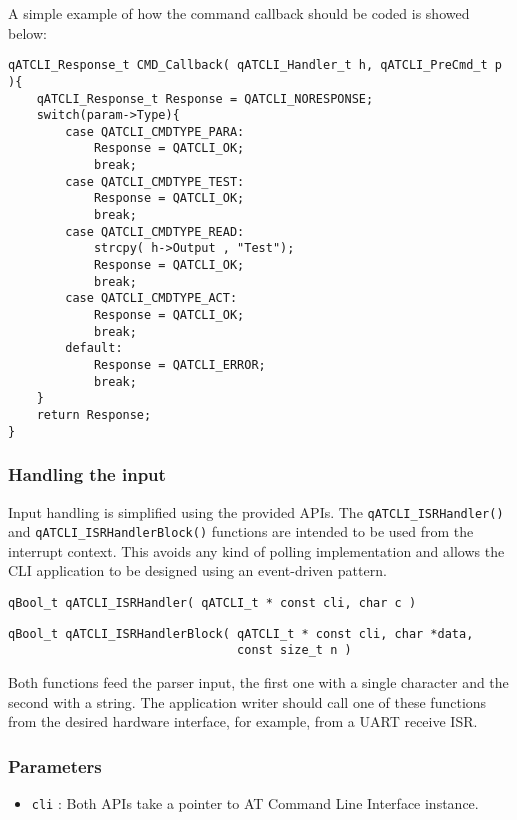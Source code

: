 A simple example of how the command callback should be coded is showed below: \\

\begin{lstlisting}[style=CStyle]
qATCLI_Response_t CMD_Callback( qATCLI_Handler_t h, qATCLI_PreCmd_t p ){
	qATCLI_Response_t Response = QATCLI_NORESPONSE;
	switch(param->Type){
		case QATCLI_CMDTYPE_PARA:
			Response = QATCLI_OK;
			break;
		case QATCLI_CMDTYPE_TEST:
			Response = QATCLI_OK;
			break;
		case QATCLI_CMDTYPE_READ:
		    strcpy( h->Output , "Test");
			Response = QATCLI_OK;
			break;
		case QATCLI_CMDTYPE_ACT:
			Response = QATCLI_OK;
			break;			
		default:
			Response = QATCLI_ERROR;
			break;
	}
	return Response;
}
\end{lstlisting}


\subsubsection{Handling the input}
Input handling is simplified using the provided APIs. The \lstinline{qATCLI_ISRHandler()}  and \lstinline{qATCLI_ISRHandlerBlock()}   functions are intended to be used from the interrupt context. This avoids any kind of polling implementation and allows the CLI application to be designed using an event-driven pattern.

\begin{lstlisting}[style=CStyle]
qBool_t qATCLI_ISRHandler( qATCLI_t * const cli, char c )
\end{lstlisting}

\begin{lstlisting}[style=CStyle]
qBool_t qATCLI_ISRHandlerBlock( qATCLI_t * const cli, char *data, 
                                const size_t n )
\end{lstlisting}

Both functions feed the parser input, the first one with a single character and the second with a string. The application writer should call one of these functions from the desired hardware interface, for example, from a UART receive ISR. 

\subsubsection*{Parameters}
\begin{itemize}
    \item \lstinline{cli} : Both APIs take a pointer to AT Command Line Interface instance.
\end{itemize}

